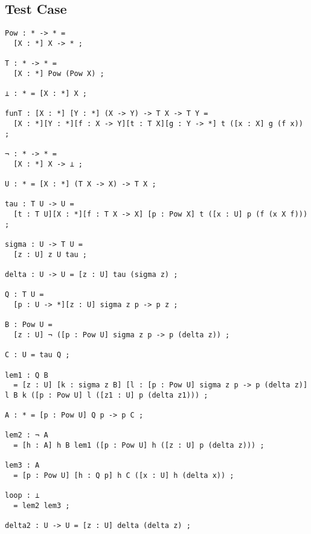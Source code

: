 \documentclass{article}
\theoremstyle{remark}
\begin{document}
\subsection{Test Case} \label{apdix:loop}
\begin{verbatim}
Pow : * -> * =
  [X : *] X -> * ;

T : * -> * =
  [X : *] Pow (Pow X) ;

⊥ : * = [X : *] X ;

funT : [X : *] [Y : *] (X -> Y) -> T X -> T Y =
  [X : *][Y : *][f : X -> Y][t : T X][g : Y -> *] t ([x : X] g (f x)) ;

¬ : * -> * =
  [X : *] X -> ⊥ ;

U : * = [X : *] (T X -> X) -> T X ;

tau : T U -> U =
  [t : T U][X : *][f : T X -> X] [p : Pow X] t ([x : U] p (f (x X f))) ;

sigma : U -> T U =
  [z : U] z U tau ;

delta : U -> U = [z : U] tau (sigma z) ;

Q : T U =
  [p : U -> *][z : U] sigma z p -> p z ;

B : Pow U =
  [z : U] ¬ ([p : Pow U] sigma z p -> p (delta z)) ;

C : U = tau Q ;

lem1 : Q B
  = [z : U] [k : sigma z B] [l : [p : Pow U] sigma z p -> p (delta z)] l B k ([p : Pow U] l ([z1 : U] p (delta z1))) ;

A : * = [p : Pow U] Q p -> p C ;

lem2 : ¬ A
  = [h : A] h B lem1 ([p : Pow U] h ([z : U] p (delta z))) ;

lem3 : A
  = [p : Pow U] [h : Q p] h C ([x : U] h (delta x)) ;

loop : ⊥
  = lem2 lem3 ;

delta2 : U -> U = [z : U] delta (delta z) ;
\end{verbatim}
\end{document}
